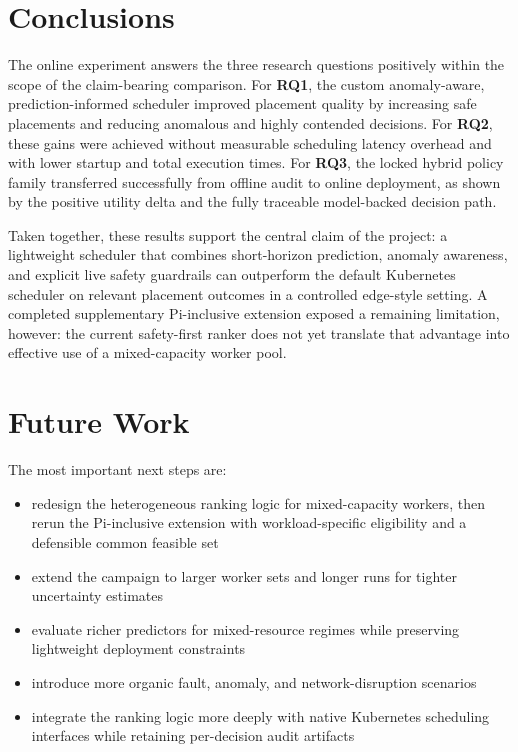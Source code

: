 \section{Conclusions}
\label{sec:conclusions}

The online experiment answers the three research questions positively within the scope of the claim-bearing comparison. For \textbf{RQ1}, the custom anomaly-aware, prediction-informed scheduler improved placement quality by increasing safe placements and reducing anomalous and highly contended decisions. For \textbf{RQ2}, these gains were achieved without measurable scheduling latency overhead and with lower startup and total execution times. For \textbf{RQ3}, the locked hybrid policy family transferred successfully from offline audit to online deployment, as shown by the positive utility delta and the fully traceable model-backed decision path.

Taken together, these results support the central claim of the project: a lightweight scheduler that combines short-horizon prediction, anomaly awareness, and explicit live safety guardrails can outperform the default Kubernetes scheduler on relevant placement outcomes in a controlled edge-style setting. A completed supplementary Pi-inclusive extension exposed a remaining limitation, however: the current safety-first ranker does not yet translate that advantage into effective use of a mixed-capacity worker pool.


\section{Future Work}
\label{sec:future-work}

The most important next steps are:

\begin{itemize}
\item redesign the heterogeneous ranking logic for mixed-capacity workers, then rerun the Pi-inclusive extension with workload-specific eligibility and a defensible common feasible set
\item extend the campaign to larger worker sets and longer runs for tighter uncertainty estimates
\item evaluate richer predictors for mixed-resource regimes while preserving lightweight deployment constraints
\item introduce more organic fault, anomaly, and network-disruption scenarios
\item integrate the ranking logic more deeply with native Kubernetes scheduling interfaces while retaining per-decision audit artifacts
\end{itemize}

